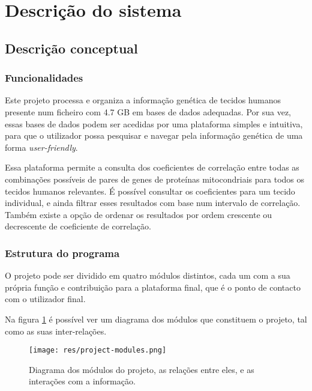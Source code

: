 \section{Descrição do sistema}

\subsection{Descrição conceptual}

\subsubsection{Funcionalidades}

Este projeto processa e organiza a informação genética de tecidos humanos presente num ficheiro com 4.7 GB em bases de dados adequadas. Por sua vez, essas bases de dados podem ser acedidas por uma plataforma simples e intuitiva, para que o utilizador possa pesquisar e navegar pela informação genética de uma forma \textit{user-friendly}.

Essa plataforma permite a consulta dos coeficientes de correlação entre todas as combinações possíveis de pares de genes de proteínas mitocondriais para todos os tecidos humanos relevantes. É possível consultar os coeficientes para um tecido individual, e ainda filtrar esses resultados com base num intervalo de correlação. Também existe a opção de ordenar os resultados por ordem crescente ou decrescente de coeficiente de correlação.

\subsubsection{Estrutura do programa}

O projeto pode ser dividido em quatro módulos distintos, cada um com a sua própria função e contribuição para a plataforma final, que é o ponto de contacto com o utilizador final.

Na figura \ref{fig:project-modules} é possível ver um diagrama dos módulos que constituem o projeto, tal como as suas inter-relações.

\medskip

\begin{figure}[ht]
    \centering
    \texttt{[image: res/project-modules.png]}
    \caption{Diagrama dos módulos do projeto, as relações entre eles, e as interações com a informação.}
    \label{fig:project-modules}
\end{figure}


